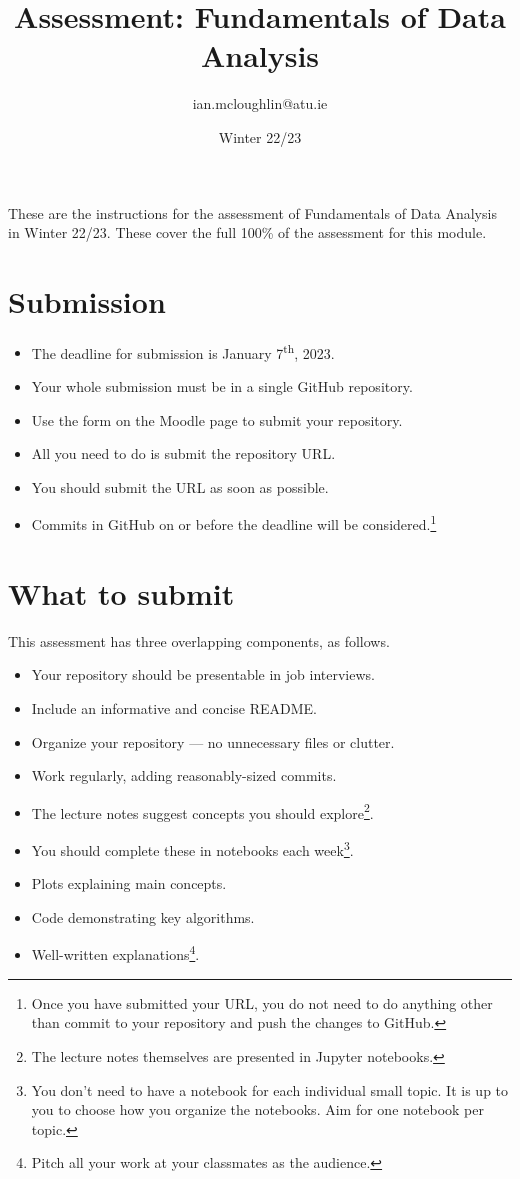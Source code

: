 \documentclass[a4paper]{tufte-handout}
\title{Assessment: Fundamentals of Data Analysis}
\author{ian.mcloughlin@atu.ie}
\date{Winter 22/23}
\begin{document}
 
\maketitle

These are the instructions for the assessment of Fundamentals of Data Analysis in Winter 22/23.
These cover the full 100\% of the assessment for this module.


\section{Submission}

\begin{itemize}
  \item The deadline for submission is January 7\textsuperscript{th}, 2023. 
  \item Your whole submission must be in a single GitHub repository.
  \item Use the form on the Moodle page to submit your repository.
  \item All you need to do is submit the repository URL.
  \item You should submit the URL as soon as possible.
  \item Commits in GitHub on or before the deadline will be considered.\footnote{Once you have submitted your URL, you do not need to do anything other than commit to your repository and push the changes to GitHub.}
\end{itemize}


\section{What to submit}
This assessment has three overlapping components, as follows.

\begin{itemize}
  \item Your repository should be presentable in job interviews.
  \item Include an informative and concise README.
  \item Organize your repository --- no unnecessary files or clutter.
  \item Work regularly, adding reasonably-sized commits.
\end{itemize}

\begin{itemize}
  \item The lecture notes suggest concepts you should explore\footnote{The lecture notes themselves are presented in Jupyter notebooks.}.
  \item You should complete these in notebooks each week\footnote{You don't need to have a notebook for each individual small topic. It is up to you to choose how you organize the notebooks. Aim for one notebook per topic.}.
  \item Plots explaining main concepts.
  \item Code demonstrating key algorithms.
  \item Well-written explanations\footnote{Pitch all your work at your classmates as the audience.}.
\end{itemize} 
\end{document}
